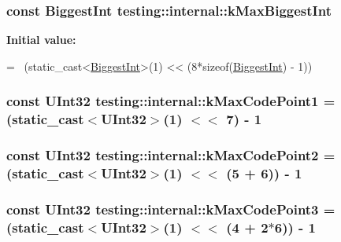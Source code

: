 \subsubsection[{\texorpdfstring{k\+Max\+Biggest\+Int}{kMaxBiggestInt}}]{\setlength{\rightskip}{0pt plus 5cm}const {\bf Biggest\+Int} testing\+::internal\+::k\+Max\+Biggest\+Int}\hypertarget{namespacetesting_1_1internal_ad901880198832bc166d2493096b451f7}{}\label{namespacetesting_1_1internal_ad901880198832bc166d2493096b451f7}
{\bfseries Initial value\+:}
\begin{DoxyCode}
=
    ~(\textcolor{keyword}{static\_cast<}\hyperlink{namespacetesting_1_1internal_a05c6bd9ede5ccdf25191a590d610dcc6}{BiggestInt}\textcolor{keyword}{>}(1) << (8*\textcolor{keyword}{sizeof}(\hyperlink{namespacetesting_1_1internal_a05c6bd9ede5ccdf25191a590d610dcc6}{BiggestInt}) - 1))
\end{DoxyCode}
\subsubsection[{\texorpdfstring{k\+Max\+Code\+Point1}{kMaxCodePoint1}}]{\setlength{\rightskip}{0pt plus 5cm}const {\bf U\+Int32} testing\+::internal\+::k\+Max\+Code\+Point1 = (static\+\_\+cast$<${\bf U\+Int32}$>$(1) $<$$<$ 7) -\/ 1}\hypertarget{namespacetesting_1_1internal_a128515c8ed6c0fe98e498c8042da2060}{}\label{namespacetesting_1_1internal_a128515c8ed6c0fe98e498c8042da2060}
\subsubsection[{\texorpdfstring{k\+Max\+Code\+Point2}{kMaxCodePoint2}}]{\setlength{\rightskip}{0pt plus 5cm}const {\bf U\+Int32} testing\+::internal\+::k\+Max\+Code\+Point2 = (static\+\_\+cast$<${\bf U\+Int32}$>$(1) $<$$<$ (5 + 6)) -\/ 1}\hypertarget{namespacetesting_1_1internal_ab8f4a5ed784352f00342cfeadc72337e}{}\label{namespacetesting_1_1internal_ab8f4a5ed784352f00342cfeadc72337e}
\subsubsection[{\texorpdfstring{k\+Max\+Code\+Point3}{kMaxCodePoint3}}]{\setlength{\rightskip}{0pt plus 5cm}const {\bf U\+Int32} testing\+::internal\+::k\+Max\+Code\+Point3 = (static\+\_\+cast$<${\bf U\+Int32}$>$(1) $<$$<$ (4 + 2$\ast$6)) -\/ 1}\hypertarget{namespacetesting_1_1internal_aa42bd507418e570402996e33582beed3}{}\label{namespacetesting_1_1internal_aa42bd507418e570402996e33582beed3}
